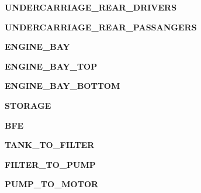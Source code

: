 \begin{DoxyCompactItemize}
\item 
\hypertarget{enumEnums_1_1Location_a5c4e347e7feddd1500209edf9c1a8694}{}{\bfseries U\+N\+D\+E\+R\+C\+A\+R\+R\+I\+A\+G\+E\+\_\+\+R\+E\+A\+R\+\_\+\+D\+R\+I\+V\+E\+R\+S}\label{enumEnums_1_1Location_a5c4e347e7feddd1500209edf9c1a8694}

\item 
\hypertarget{enumEnums_1_1Location_a9849f01a8704725eac4a6bbbc37b003a}{}{\bfseries U\+N\+D\+E\+R\+C\+A\+R\+R\+I\+A\+G\+E\+\_\+\+R\+E\+A\+R\+\_\+\+P\+A\+S\+S\+A\+N\+G\+E\+R\+S}\label{enumEnums_1_1Location_a9849f01a8704725eac4a6bbbc37b003a}

\item 
\hypertarget{enumEnums_1_1Location_a1e97ec32292cbcceb85c17c1b6c18fee}{}{\bfseries E\+N\+G\+I\+N\+E\+\_\+\+B\+A\+Y}\label{enumEnums_1_1Location_a1e97ec32292cbcceb85c17c1b6c18fee}

\item 
\hypertarget{enumEnums_1_1Location_adcdd255b1f47fca111a5360e7950e9e0}{}{\bfseries E\+N\+G\+I\+N\+E\+\_\+\+B\+A\+Y\+\_\+\+T\+O\+P}\label{enumEnums_1_1Location_adcdd255b1f47fca111a5360e7950e9e0}

\item 
\hypertarget{enumEnums_1_1Location_ad89fa12fc6603cb1b598491ccbbb5cd5}{}{\bfseries E\+N\+G\+I\+N\+E\+\_\+\+B\+A\+Y\+\_\+\+B\+O\+T\+T\+O\+M}\label{enumEnums_1_1Location_ad89fa12fc6603cb1b598491ccbbb5cd5}

\item 
\hypertarget{enumEnums_1_1Location_ab3b107a9ca613fef3f827e8bb5a63e54}{}{\bfseries S\+T\+O\+R\+A\+G\+E}\label{enumEnums_1_1Location_ab3b107a9ca613fef3f827e8bb5a63e54}

\item 
\hypertarget{enumEnums_1_1Location_a23a000d275a23614b8eee02e7de66fec}{}{\bfseries B\+F\+E}\label{enumEnums_1_1Location_a23a000d275a23614b8eee02e7de66fec}

\item 
\hypertarget{enumEnums_1_1Location_abad04f2de97dde1c3744fa784adc694a}{}{\bfseries T\+A\+N\+K\+\_\+\+T\+O\+\_\+\+F\+I\+L\+T\+E\+R}\label{enumEnums_1_1Location_abad04f2de97dde1c3744fa784adc694a}

\item 
\hypertarget{enumEnums_1_1Location_a8b897f5f024499b4e3ba1d75d47cb646}{}{\bfseries F\+I\+L\+T\+E\+R\+\_\+\+T\+O\+\_\+\+P\+U\+M\+P}\label{enumEnums_1_1Location_a8b897f5f024499b4e3ba1d75d47cb646}

\item 
\hypertarget{enumEnums_1_1Location_ac7d88ed4a90416a308f7b7882d3c5eb7}{}{\bfseries P\+U\+M\+P\+\_\+\+T\+O\+\_\+\+M\+O\+T\+O\+R}\label{enumEnums_1_1Location_ac7d88ed4a90416a308f7b7882d3c5eb7}


\end{DoxyCompactItemize}

